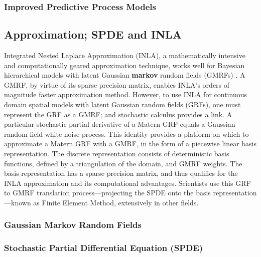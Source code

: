 \documentclass{article}
\begin{document}
\subsubsection{Improved Predictive Process Models}


\subsection{Approximation; SPDE and INLA} %
Integrated Nested Laplace Approximation (INLA), a mathematically intensive and computationally geared approximation technique, works well for Bayesian hierarchical models with latent Gaussian {\bf markov} random fields (GMRFs) \citep{Rue2007}. A GMRF, by virtue of its sparse precision matrix, enables INLA's orders of magnitude faster approximation method. However, to use INLA for continuous domain spatial models with latent Gaussian random fields (GRFs), one must represent the GRF as a GMRF; and stochastic calculus provides a link. A particular stochastic partial derivative of a Matern GRF equals a Gaussian random field white noise process. This identity provides a platform on which to approximate a Matern GRF with a GMRF, in the form of a piecewise linear basis representation. The discrete representation consists of deterministic basis functions, defined by a triangulation of the domain, and GMRF weights. The basis representation has a sparse precision matrix, and thus qualifies for the INLA approximation and its computational advantages. Scientists use this GRF to GMRF translation process---projecting the SPDE onto the basis representation---known as Finite Element Method, extensively in other fields. 
\subsubsection{Gaussian Markov Random Fields}

\subsubsection{Stochastic Partial Differential Equation (SPDE)} 
\end{document}
